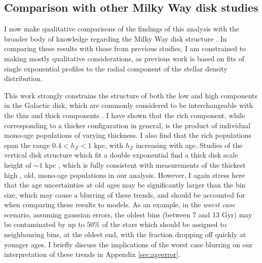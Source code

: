 \subsection{Comparison with other Milky Way disk studies}
I now make qualitative comparisons of the findings of this analysis with the broader body of knowledge regarding the Milky Way disk structure \citep[see, e.g.][for recent reviews]{2013A&ARv..21...61R,2016ARA&A..54..529B}. In comparing these results with those from previous studies, I am constrained to making mostly qualitative considerations, as previous work is based on fits of single exponential profiles to the radial component of the stellar density distribution.

This work strongly constrains the structure of both the low and high \afe{} components in the Galactic disk, which are commonly considered to be interchangeable with the thin and thick components \citep[as asserted by, e.g.][]{2004A&A...415..155B,2012A&A...545A..32A,1998A&A...338..161F}. I have shown that the \afe{} rich component, while corresponding to a thicker configuration in general, is the product of individual mono-age populations of varying thickness. I also find that the \afe{} rich populations span the range  $ 0.4 < h_Z < 1$ kpc, with $h_Z$ increasing with age. Studies of the vertical disk structure which fit a double exponential find a thick disk scale height of $\sim 1$ kpc  \citep[e.g.][]{1983MNRAS.202.1025G,2008ApJ...673..864J}, which is fully consistent with measurements of the thickest high \afe{}, old, mono-age populations in our analysis. However, I again stress here that the age uncertainties at old ages may be significantly larger than the bin size, which may cause a blurring of these trends, and should be accounted for when comparing these results to models. As an example, in the \emph{worst case} scenario, assuming gaussian errors, the oldest bins (between 7 and 13 Gyr) may be contaminated by up to $50\%$ of the stars which should be assigned to neighbouring bins, at the oldest end, with the fraction dropping off quickly at younger ages. I briefly discuss the implications of the worst case blurring on our interpretation of these trends in Appendix \ref{sec:ageerror}.

